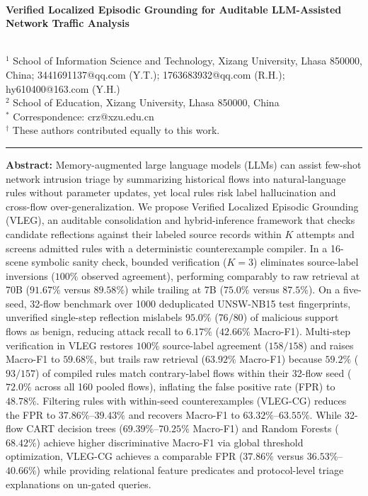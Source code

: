 \documentclass[10pt,a4paper,onecolumn]{article}
\theoremstyle{definition}
\theoremstyle{remark}
\begin{document}
\\[0.4em]
{\LARGE\bfseries Verified Localized Episodic Grounding for Auditable LLM-Assisted Network Traffic Analysis\par}
\vspace{0.8em}

\\[0.4em]
{\small
$^{1}$ School of Information Science and Technology, Xizang University, Lhasa 850000, China; 3441691137@qq.com (Y.T.); 1763683932@qq.com (R.H.); hy610400@163.com (Y.H.)\\
$^{2}$ School of Education, Xizang University, Lhasa 850000, China\\
$^{*}$ Correspondence: crz@xzu.edu.cn\\
$^{\dagger}$ These authors contributed equally to this work.
}

\vspace{0.8em}
\hrule
\vspace{0.6em}
\noindent\textbf{Abstract:} Memory-augmented large language models (LLMs) can assist few-shot network intrusion triage by summarizing historical flows into natural-language rules without parameter updates, yet local rules risk label hallucination and cross-flow over-generalization. We propose Verified Localized Episodic Grounding (VLEG), an auditable consolidation and hybrid-inference framework that checks candidate reflections against their labeled source records within $K$ attempts and screens admitted rules with a deterministic counterexample compiler. In a 16-scene symbolic sanity check, bounded verification ($K=3$) eliminates source-label inversions ($100\%$ observed agreement), performing comparably to raw retrieval at 70B ($91.67\%$ versus $89.58\%$) while trailing at 7B ($75.0\%$ versus $87.5\%$). On a five-seed, 32-flow benchmark over 1000 deduplicated UNSW-NB15 test fingerprints, unverified single-step reflection mislabels $95.0\%$ ($76/80$) of malicious support flows as benign, reducing attack recall to $6.17\%$ ($42.66\%$ Macro-F1). Multi-step verification in VLEG restores $100\%$ source-label agreement ($158/158$) and raises Macro-F1 to $59.68\%$, but trails raw retrieval ($63.92\%$ Macro-F1) because $59.2\%$ ($93/157$) of compiled rules match contrary-label flows within their 32-flow seed ($72.0\%$ across all 160 pooled flows), inflating the false positive rate (FPR) to $48.78\%$. Filtering rules with within-seed counterexamples (VLEG-CG) reduces the FPR to $37.86\%$--$39.43\%$ and recovers Macro-F1 to $63.32\%$--$63.55\%$. While 32-flow CART decision trees ($69.39\%$--$70.25\%$ Macro-F1) and Random Forests ($68.42\%$) achieve higher discriminative Macro-F1 via global threshold optimization, VLEG-CG achieves a comparable FPR ($37.86\%$ versus $36.53\%$--$40.66\%$) while providing relational feature predicates and protocol-level triage explanations on un-gated queries.
\end{document}
